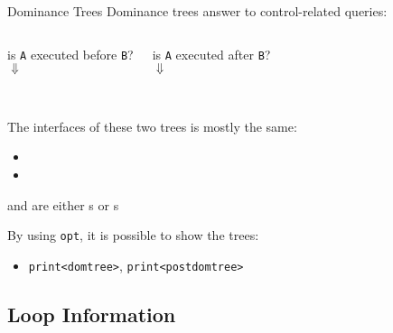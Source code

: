\begin{frame}{Dominance Trees}
Dominance trees answer to control-related queries:\\

\vfill
\begin{columns}[onlytextwidth]
\begin{centering}
is \texttt{A} executed \alert{before} \texttt{B}?\\
$\Downarrow$\\
\\
\end{centering}

\begin{centering}
is \texttt{A} executed \alert{after} \texttt{B}?\\
$\Downarrow$\\
\\
\end{centering}
\end{columns}

\vfill
The interfaces of these two trees is mostly the same:

\begin{itemize}
\item {}
\item {}
\end{itemize}

 and  are either
s or
s

\vfill
By using \texttt{opt}, it is possible to show the trees:

\begin{itemize}
\item \texttt{print<domtree>}, \texttt{print<postdomtree>}
\end{itemize}
\end{frame}


\subsection{Loop Information}


